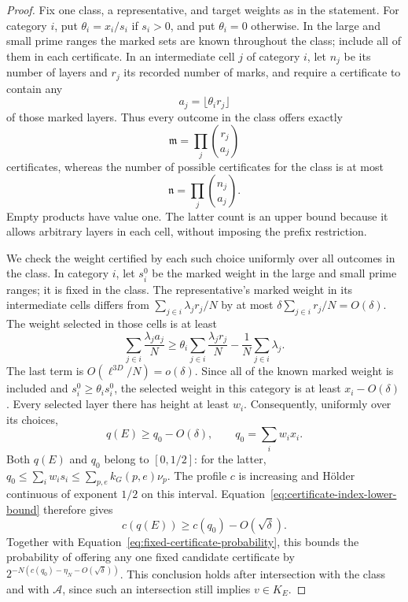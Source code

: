 \begin{proof}
Fix one class, a representative, and target weights as in the statement.
For category \(i\), put \(\theta_i=x_i/s_i\) if \(s_i>0\), and put
\(\theta_i=0\) otherwise. In the large and small prime ranges the
marked sets are known throughout the class; include all of them in each
certificate. In an intermediate cell \(j\) of category \(i\), let
\(n_j\) be its number of layers and \(r_j\) its recorded number of
marks, and require a certificate to contain any
\[
 a_j=\lfloor\theta_i r_j\rfloor
\]
of those marked layers. Thus every outcome in the class offers exactly
\[
 \mathfrak m=\prod_j\binom{r_j}{a_j}
\]
certificates, whereas the number of possible certificates for the class
is at most
\[
 \mathfrak n=\prod_j\binom{n_j}{a_j}.
\]
Empty products have value one. The latter count is an upper bound because
it allows arbitrary layers in each cell, without imposing the prefix
restriction.

We check the weight certified by each such choice uniformly over all
outcomes in the class. In category \(i\), let \(s_i^0\) be the marked
weight in the large and small prime ranges; it is fixed in the class.
The representative's marked weight in its intermediate cells differs
from \(\sum_{j\in i}\lambda_jr_j/N\) by at most
\(\delta\sum_{j\in i}r_j/N=O(\delta)\). The weight selected in those
cells is at least
\[
 \sum_{j\in i}\frac{\lambda_j a_j}{N}
 \ge \theta_i\sum_{j\in i}\frac{\lambda_j r_j}{N}
              -\frac1N\sum_{j\in i}\lambda_j.
\]
The last term is \(O(\ell^{3D}/N)=o(\delta)\). Since all of the
known marked weight is included and \(s_i^0\ge\theta_i s_i^0\), the
selected weight in this category is at least \(x_i-O(\delta)\).
Every selected layer there has height at least \(w_i\). Consequently,
uniformly over its choices,
\begin{equation}\label{eq:certificate-index-lower-bound}
 q(E)\ge q_0-O(\delta),\qquad q_0=\sum_i w_i x_i.
\end{equation}
Both \(q(E)\) and \(q_0\) belong to \([0,1/2]\): for the latter,
\(q_0\le\sum_i w_i s_i\le\sum_{p,e}k_G(p,e)\nu_p\).
The profile \(c\) is increasing and H\"older continuous of exponent
\(1/2\) on this interval. Equation~\eqref{eq:certificate-index-lower-bound}
therefore gives
\[
 c(q(E))\ge c(q_0)-O(\sqrt\delta).
\]
Together with Equation~\eqref{eq:fixed-certificate-probability}, this
bounds the probability of offering any one fixed candidate certificate
by \(2^{-N(c(q_0)-\eta_N-O(\sqrt\delta))}\). This conclusion holds
after intersection with the class and with \(\mathcal A\), since such
an intersection still implies \(v\in K_E\).


\end{proof}

